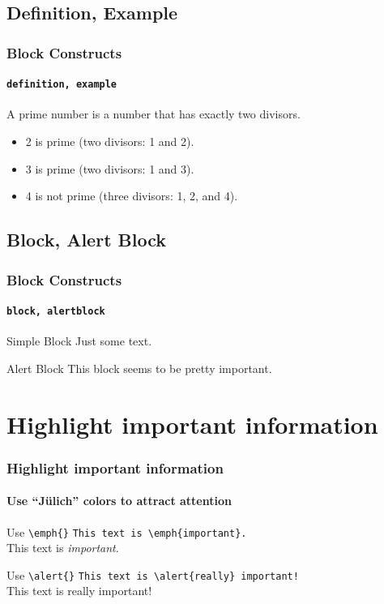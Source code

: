 \subsection{Definition, Example}
\begin{frame}
        \frametitle{Block Constructs}
        \framesubtitle{{\tt definition, example}}
        \begin{definition}
                A \alert{prime number} is a number that has exactly two divisors.
        \end{definition}
        \begin{example}
                \begin{itemize}
                        \item 2 is prime (two divisors: 1 and 2).
                        \item 3 is prime (two divisors: 1 and 3).
                        \item 4 is not prime (\alert{three} divisors: 1, 2, and 4).
                \end{itemize}
        \end{example}
\end{frame}

\subsection{Block, Alert Block}
\begin{frame}
        \frametitle{Block Constructs}
        \framesubtitle{{\tt block, alertblock}}
        \begin{block}{Simple Block}
                Just some text.
        \end{block}
        \begin{alertblock}{Alert Block}
                This block seems to be pretty important.
        \end{alertblock}
\end{frame}

\section{Highlight important information}
\begin{frame}[fragile]
        \frametitle{Highlight important information}
        \framesubtitle{Use ``Jülich'' colors to attract attention}
        \begin{block}{Use {\tt \textbackslash{}emph\{\}}}
                \verb+This text is \emph{important}.+ \\
                This text is \emph{important}.
        \end{block}
        \begin{block}{Use {\tt \textbackslash{}alert\{\}}}
                \verb+This text is \alert{really} important!+ \\
                This text is \alert{really} important!
        \end{block}
\end{frame}

